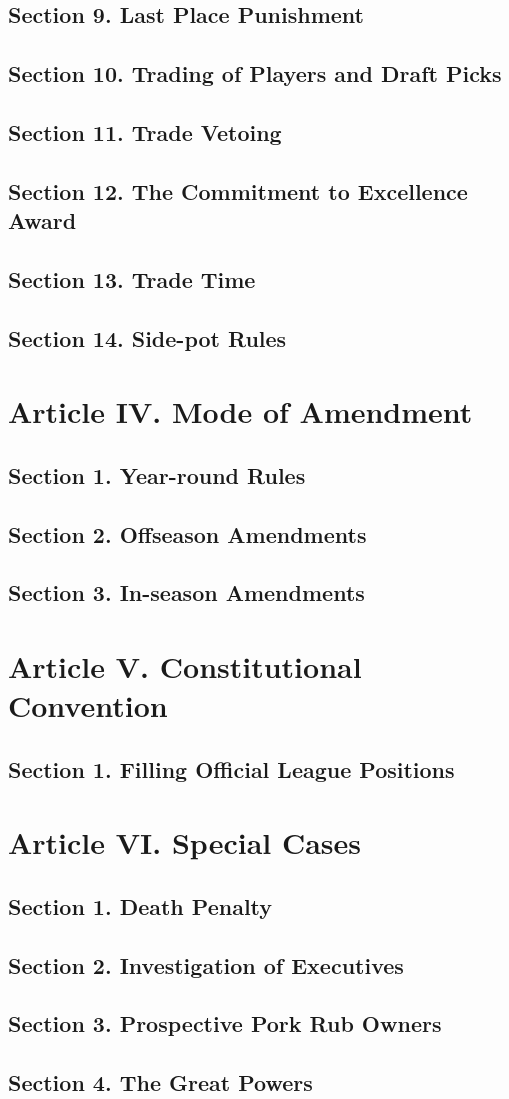 \documentclass{article}
\begin{document}
    \subsection*{Section 9. Last Place Punishment}
    \subsection*{Section 10. Trading of Players and Draft Picks}
    \subsection*{Section 11. Trade Vetoing}
    \subsection*{Section 12. The Commitment to Excellence Award}
    \subsection*{Section 13. Trade Time}
    \subsection*{Section 14. Side-pot Rules}

\section{Article IV. Mode of Amendment}
    \subsection*{Section 1. Year-round Rules}
    \subsection*{Section 2. Offseason Amendments}
    \subsection*{Section 3. In-season Amendments}

\section{Article V. Constitutional Convention}
    \subsection*{Section 1. Filling Official League Positions}

\section{Article VI. Special Cases}
    \subsection*{Section 1. Death Penalty}
    \subsection*{Section 2. Investigation of Executives}
    \subsection*{Section 3. Prospective Pork Rub Owners}
    \subsection*{Section 4. The Great Powers}
\end{document}
